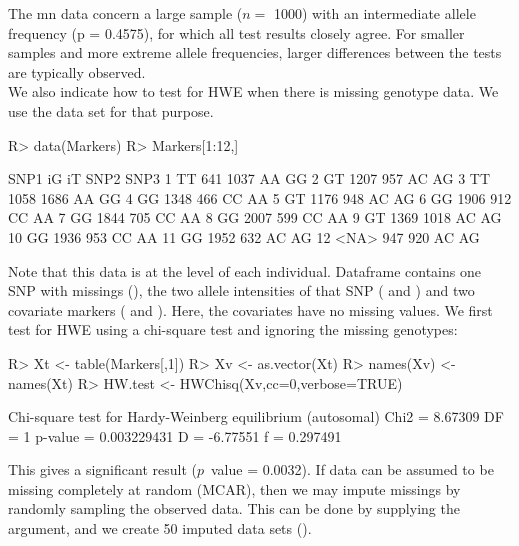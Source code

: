 \documentclass[nojss]{jss}
\begin{document}
The {\sc mn} data concern a large sample ($n =$ 1000) with an intermediate allele frequency 
(p = 0.4575), for which all test results closely agree. For smaller samples
and more extreme allele frequencies, larger differences between the tests are typically observed.\\

We also indicate how to test for HWE when there is missing genotype
data. We use the data set  for that purpose.
%

\begin{Schunk}
\begin{Sinput}
R> data(Markers)
R> Markers[1:12,]
\end{Sinput}
\begin{Soutput}
   SNP1   iG   iT SNP2 SNP3
1    TT  641 1037   AA   GG
2    GT 1207  957   AC   AG
3    TT 1058 1686   AA   GG
4    GG 1348  466   CC   AA
5    GT 1176  948   AC   AG
6    GG 1906  912   CC   AA
7    GG 1844  705   CC   AA
8    GG 2007  599   CC   AA
9    GT 1369 1018   AC   AG
10   GG 1936  953   CC   AA
11   GG 1952  632   AC   AG
12 <NA>  947  920   AC   AG
\end{Soutput}
\end{Schunk}

%
Note that this data is at the level of each individual. Dataframe
 contains one SNP with missings (), the two
allele intensities of that SNP ( and ) and two
covariate markers ( and ). Here, the covariates
have no missing values. We first test  for HWE using a
chi-square test and ignoring the missing genotypes:
% 


\begin{Schunk}
\begin{Sinput}
R> Xt <- table(Markers[,1])
R> Xv <- as.vector(Xt)
R> names(Xv) <- names(Xt)
R> HW.test <- HWChisq(Xv,cc=0,verbose=TRUE)
\end{Sinput}
\begin{Soutput}
Chi-square test for Hardy-Weinberg equilibrium (autosomal)
Chi2 =  8.67309 DF =  1 p-value =  0.003229431 D =  -6.77551 f =  0.297491 
\end{Soutput}
\end{Schunk}

%
This gives a significant result ($p$~value = 0.0032). 
If data can be
assumed to be missing completely at random (MCAR), then we may impute
missings by randomly sampling the observed data. This can be done by
supplying the  argument, and we create 50
imputed data sets ().
%
\end{document}
